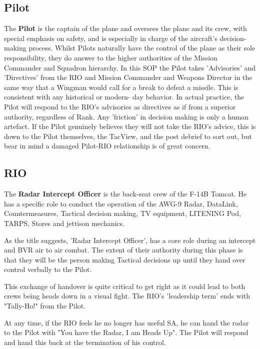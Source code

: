 \subsection*{Pilot}

The \textbf{Pilot} is the captain of the plane and oversees the plane and its
crew, with special emphasis on safety, and is especially in charge of the
aircraft's decision-making process. Whilst Pilots naturally have the control of
the plane as their sole responsibility, they do answer to the higher
authorities of the Mission Commander and Squadron hierarchy. In this SOP the
Pilot takes 'Advisories' and 'Directives' from the RIO and Mission Commander
and Weapons Director in the same way that a Wingman would call for a break to
defeat a missile. This is consistent with any historical or modern- day
behavior. In actual practice, the Pilot will respond to the RIO's advisories as
directives as if from a superior authority, regardless of Rank. Any 'friction'
in decision making is only a human artefact. If the Pilot genuinely believes
they will not take the RIO's advice, this is down to the Pilot themselves, the
TacView, and the post debrief to sort out, but bear in mind a damaged Pilot-RIO
relationship is of great concern.

\subsection*{RIO}

The \textbf{Radar Intercept Officer} is the back-seat crew of the F-14B Tomcat.
He has a specific role to conduct the operation of the AWG-9 Radar, DataLink,
Countermeasures, Tactical decision making, TV equipment, LITENING Pod, TARPS,
Stores and jettison mechanics.

As the title suggests, 'Radar Intercept Officer', has a core role during an
intercept and BVR air to air combat. The extent of their authority during this
phase is that they will be the person making Tactical decisions up until they
hand over control verbally to the Pilot.

This exchange of handover is quite critical to get right as it could lead to
both crews being heads down in a visual fight. The RIO's 'leadership term' ends
with "Tally-Ho!" from the Pilot.

At any time, if the RIO feels he no longer has useful SA, he can hand the radar
to the Pilot with "You have the Radar, I am Heads Up". The Pilot will respond
and hand this back at the termination of his control.

